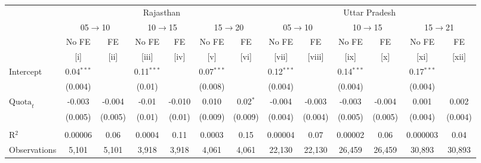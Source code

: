 
\begingroup
\centering
\scriptsize
\begin{adjustbox}{max width=\linewidth}
   \begin{threeparttable}[b]
      \begin{tabular}{lcccccccccccc}
         \toprule
          & \multicolumn{6}{c}{Rajasthan} & \multicolumn{6}{c}{Uttar Pradesh} \\ 
          & \multicolumn{2}{c}{05$\rightarrow$10} & \multicolumn{2}{c}{10$\rightarrow$15} & \multicolumn{2}{c}{15$\rightarrow$20} & \multicolumn{2}{c}{05$\rightarrow$10} & \multicolumn{2}{c}{10$\rightarrow$15} & \multicolumn{2}{c}{15$\rightarrow$21} \\ 
                               & No FE        & FE            & No FE        & FE            & No FE        & FE            & No FE        & FE            & No FE        & FE            & No FE        & FE \\   
                               & [i]          & [ii]          & [iii]        & [iv]          & [v]          & [vi]          & [vii]        & [viii]        & [ix]         & [x]           & [xi]         & [xii]\\  
         \midrule 
         Intercept             & 0.04$^{***}$ &               & 0.11$^{***}$ &               & 0.07$^{***}$ &               & 0.12$^{***}$ &               & 0.14$^{***}$ &               & 0.17$^{***}$ &   \\   
                               & (0.004)      &               & (0.01)       &               & (0.008)      &               & (0.004)      &               & (0.004)      &               & (0.004)      &   \\   
         $\text{Quota}_{t}$    & -0.003       & -0.004        & -0.01        & -0.010        & 0.010        & 0.02$^{*}$    & -0.004       & -0.003        & -0.003       & -0.004        & 0.001        & 0.002\\   
                               & (0.005)      & (0.005)       & (0.01)       & (0.01)        & (0.009)      & (0.009)       & (0.004)      & (0.004)       & (0.005)      & (0.005)       & (0.004)      & (0.004)\\   
          \\
         R$^2$                 & 0.00006      & 0.06          & 0.0004       & 0.11          & 0.0003       & 0.15          & 0.00004      & 0.07          & 0.00002      & 0.06          & 0.000003     & 0.04\\  
         Observations          & 5,101        & 5,101         & 3,918        & 3,918         & 4,061        & 4,061         & 22,130       & 22,130        & 26,459       & 26,459        & 30,893       & 30,893\\  

\end{tabular}
\end{threeparttable}
\end{adjustbox}
